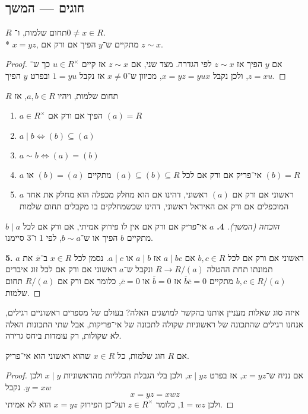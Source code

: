 \subsection{חוגים --- המשך}
\begin{lemma}
	$R$ תחום שלמות, ו־$0 \ne x \in R$. \\*
	$x = yz$, מתקיים ש־$y$ הפיך אם ורק אם $z \sim x$.
\end{lemma}
\begin{proof}
	אם $y$ הפיך אז $z \sim x$ לפי הגדרה. מצד שני, אם $z \sim x$ אז קיים $u \in R^\times$ כך ש־$z = xu$,
	ולכן נקבל $x = yz = yux$, מכיוון ש־$x \ne 0$ אז נקבל $1 = yu$ ובפרט $y$ הפיך.
\end{proof}
\begin{proposition}
	$R$ תחום שלמות, ויהיו $a, b \in R$, אז
	\begin{enumerate}
		\item $a \in R^\times$ הפיך אם ורק אם $(a) = R$
		\item $a \mid b \iff (b) \subseteq (a)$
		\item $a \sim b \iff (a) = (b)$
		\item $a$ אי־פריק אם ורק אם לכל $(a) \subseteq (b) \subseteq R$ מתקיים $(b) = (a)$ או $(b) = R$
		\item $a$ ראשוני אם ורק אם $(a)$ ראשוני, דהינו אם הוא מחלק מכפלה הוא מחלק את אחד המוכפלים אם ורק אם האידאל ראשוני, דהינו שכשמחלקים בו מקבלים תחום שלמות
	\end{enumerate}
\end{proposition}
\begin{proof}[הוכחה (המשך)]
	\textbf{4.}
	$a$ אי־פריק אם ורק אם אין לו פירוק אמיתי, אם ורק אם לכל $b \mid a$ מתקיים $b$ הפיך או ש־$b \sim a$, לפי 1 ו־3 סיימנו.

	\textbf{5.}
	$a$ ראשוני אם ורק אם לכל $b, c \in R$ אם $a \mid bc$ אז $a \mid b$ או $a \mid c$.
	נסמן לכל $x \in R$ ב־$\overline{x}$ את תמונתו תחת ההטלה $R \to R / (a)$ ונקבל ש־$a$ ראשוני אם ורק אם לכל זוג איברים $b, c \in R / (a)$
	מתקיים $\overline{b} \overline{c} = 0$ אז $\overline{b} = 0$ או $\overline{c} = 0$, כלומר אם ורק אם $R / (a)$ תחום שלמות.
\end{proof}
איזה סוג שאלות מעניין אותנו בהקשר למושגים האלה?
בעולם של מספרים ראשוניים רגילים, אנחנו רגילים שהתכונה של ראשוניות שקולה לתכונה של אי־פריקות,
אבל שתי התכונות האלה לא שקולות, רק עומדות ביחס גרירה.
\begin{proposition}
	אם $R$ חוג שלמות, כל $x \in R$ שהוא ראשוני הוא אי־פריק.
\end{proposition}
\begin{proof}
	אם נניח ש־$x = yz$, אז בפרט $x \mid yz$, ולכן בלי הגבלת הכלליות מהראשוניות $x \mid y$ ולכן $y = xw$. נקבל
	\[
		x = yz = xwz
	\]
	ולכן $1 = wz$, כלומר $z \in R^\times$ ועל־כן הפירוק $x = yz$ הוא לא אמיתי.
\end{proof}
